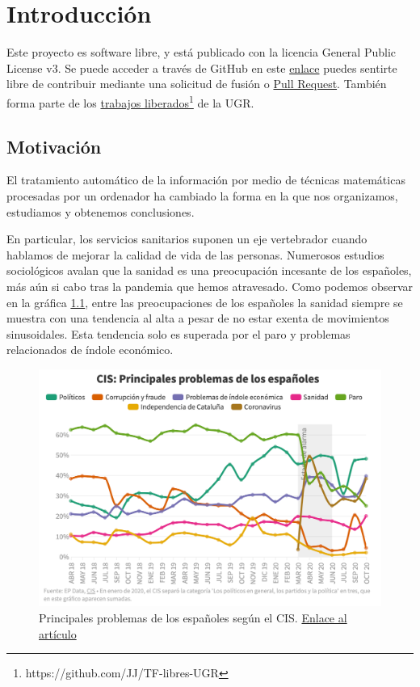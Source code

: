 \chapter{Introducción}
Este proyecto es software libre, y está publicado con la licencia \cite{gplv3} General Public License v3.
Se puede acceder a través de GitHub en este \href{https://github.com/pablojjimenez/TFG}{enlace} puedes sentirte libre de contribuir mediante una solicitud de fusión o \href{https://github.com/pablojjimenez/TFG/pulls}{Pull Request}. También forma parte de los \href{https://github.com/JJ/TF-libres-UGR}{trabajos liberados}\footnote{https://github.com/JJ/TF-libres-UGR} de la UGR.

\section{Motivación} 
El tratamiento automático de la información por medio de técnicas matemáticas procesadas por un ordenador ha cambiado la forma en la que nos organizamos, estudiamos y obtenemos conclusiones.

En particular, los servicios sanitarios suponen un eje vertebrador cuando hablamos de mejorar la calidad de vida de las personas. Numerosos estudios sociológicos avalan que la sanidad es una preocupación incesante de los españoles, más aún si cabo tras la pandemia que hemos atravesado.
Como podemos observar en la gráfica \ref{fig:problemascis}, entre las preocupaciones de los españoles la sanidad siempre se muestra con una tendencia al alta a pesar de no estar exenta de movimientos sinusoidales. Esta tendencia solo es superada por el paro y problemas relacionados de índole económico.
\FloatBarrier
\begin{figure}[]
	\centering	
	\includegraphics[scale=0.5]{doc/logos/imgs/CIS_1.png}
	\caption{ 
        Principales problemas de los españoles según el CIS. \href{https://www.rtve.es/noticias/20201015/crisis-economica-coronavirus-preocupan-ahora-mas-espanoles-paro/2045610.shtml}{Enlace al artículo}
    }
    \label{fig:problemascis}
\end{figure}
\FloatBarrier

